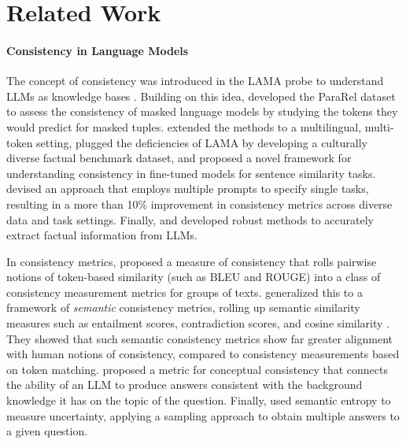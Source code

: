 \section{Related Work}
\paragraph{Consistency in Language Models}
The concept of consistency was introduced in the LAMA probe to understand LLMs as knowledge bases \citep{petroni}. Building on this idea, \citet{elazar_measuring_2021} developed the ParaRel dataset to assess the consistency of masked language models by studying the tokens they would predict for masked tuples. \citet{fierro_factual_2022} extended the methods to a multilingual, multi-token setting, \citet{keleg2023dlama} plugged the deficiencies of LAMA by developing a culturally diverse factual benchmark dataset, and \citet{jang_accurate} proposed a novel framework for understanding consistency in fine-tuned models for sentence similarity tasks. \citet{zhou} devised an approach that employs multiple prompts to specify single tasks, resulting in a more than 10\% improvement in consistency metrics across diverse data and task settings. Finally, \citet{newman_p-adapters_2022} and \citet{tam2022evaluating} developed robust methods to accurately extract factual information from LLMs.

In consistency metrics, \citet{elazar_measuring_2021} proposed a measure of consistency that rolls pairwise notions of token-based similarity (such as BLEU and ROUGE) into a class of consistency measurement metrics for groups of texts. \citet{raj2023measuring} generalized this to a framework of {\it semantic} consistency metrics, rolling up semantic similarity measures such as entailment scores, contradiction scores, and cosine similarity \citep{rabinovich-etal-2023-predicting}. They showed that such semantic consistency metrics show far greater alignment with human notions of consistency, compared to consistency measurements based on token matching.  \citet{sahu2022unpacking} proposed a metric for conceptual consistency that connects the ability of an LLM to produce answers consistent with the background knowledge it has on the topic of the question. Finally, \citet{kuhn2023semantic} used semantic entropy to measure uncertainty, applying a sampling approach to obtain multiple answers to a given question. 

